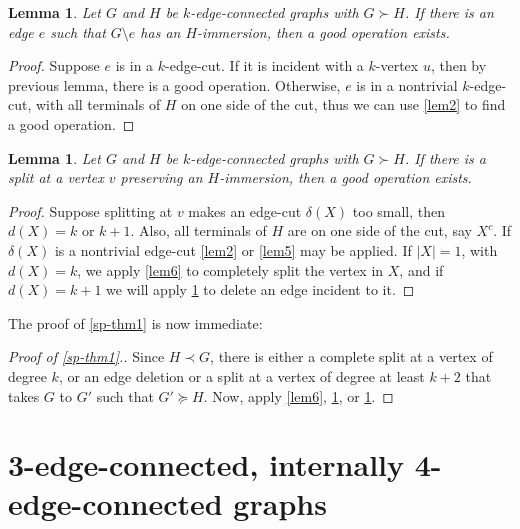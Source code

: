 \documentclass[letterpaper,11pt]{article}
\newtheorem{lemma}[theorem]{Lemma}
\theoremstyle{definition}
\begin{document}
\begin{lemma}
\label{lem7}
Let $G$ and $H$ be $k$-edge-connected graphs with $G \succ H$. If there is an edge $e$ such that $G \setminus e$ has an $H$-immersion, then a good operation exists.
\end{lemma}



\begin{proof}
Suppose $e$ is in a $k$-edge-cut. If it is incident with a $k$-vertex $u$, then by previous lemma, there is a good operation. Otherwise, $e$ is in a nontrivial $k$-edge-cut, with all terminals of $H$ on one side of the cut, thus we can use \cref{lem2} to find a good operation.
\end{proof}



\begin{lemma}
\label{lem8}
Let $G$ and $H$ be $k$-edge-connected graphs with $G \succ H$. If there is a split at a vertex $v$ preserving an $H$-immersion, then a good operation exists.
\end{lemma}



\begin{proof}
Suppose splitting at $v$ makes an edge-cut $\delta (X)$ too small, then $d(X)=k$ or $k+1$. Also, all terminals of $H$ are on one side of the cut, say $X^c$. If $\delta (X)$ is a nontrivial edge-cut \cref{lem2} or \cref{lem5} may be applied. If $|X|=1$, with $d(X)=k$, we apply \cref{lem6} to completely split the vertex in $X$, and if $d(X)=k+1$ we will apply \cref{lem7} to delete an edge incident to it.
\end{proof}


The proof of \cref{sp-thm1} is now immediate:


\begin{proof}[Proof of \cref{sp-thm1}.]
		Since $H \prec G$, there is either a complete split at a vertex of degree $k$, or an edge deletion or a split at a vertex of degree at least $k+2$ that takes $G$ to $G'$ such that $G'\succeq H$. Now, apply  \cref{lem6}, \cref{lem7}, or \cref{lem8}.
\end{proof}
\section{3-edge-connected, internally 4-edge-connected graphs}
\label{in4econ}
\end{document}
